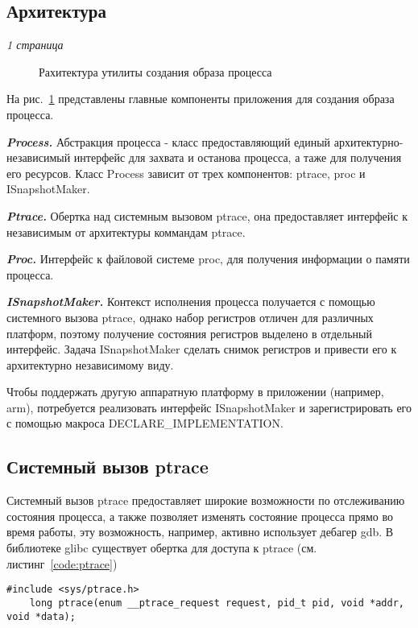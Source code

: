 \subsection{Архитектура}

\textit{1 страница}

\begin{figure}[h]
\caption{Рахитектура утилиты создания образа процесса}
\label{pic:suspend_arch}
\end{figure}

На рис.~\ref{pic:suspend_arch} представлены главные компоненты приложения для создания образа процесса.

\textbf{\textit{Process.}} Абстракция процесса - класс предоставляющий единый архитектурно-независимый интерфейс для захвата и останова процесса, а таже для получения его ресурсов. Класс Process зависит от трех компонентов: ptrace, proc и ISnapshotMaker.

\textbf{\textit{Ptrace.}} Обертка над системным вызовом ptrace, она предоставляет интерфейс к независимым от архитектуры коммандам ptrace.

\textbf{\textit{Proc.}} Интерфейс к файловой системе proc, для получения информации о памяти процесса.

\textbf{\textit{ISnapshotMaker.}} Контекст исполнения процесса получается с помощью системного вызова ptrace, однако набор регистров отличен для различных платформ, поэтому получение состояния регистров выделено в отдельный интерфейс. Задача ISnapshotMaker сделать снимок регистров и привести его к архитектурно независимому виду.

Чтобы поддержать другую аппаратную платформу в приложении (например, arm), потребуется реализовать интерфейс ISnapshotMaker и зарегистрировать его с помощью макроса DECLARE\_IMPLEMENTATION.

\subsection{Системный вызов ptrace}

Системный вызов ptrace предоставляет широкие возможности по отслеживанию состояния процесса, а также позволяет изменять состояние процесса прямо во время работы, эту возможность, например, активно использует дебагер gdb. В библиотеке glibc существует обертка для доступа к ptrace (см. листинг~\ref{code:ptrace})

\begin{lstlisting}[caption=Вызов ptrace, label=code:ptrace]
    #include <sys/ptrace.h>
    long ptrace(enum __ptrace_request request, pid_t pid, void *addr, void *data);
\end{lstlisting}

